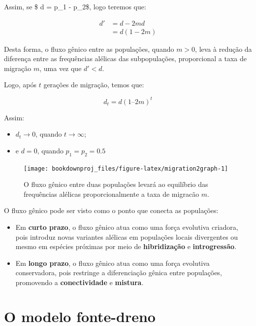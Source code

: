 \documentclass[
]{book}
\begin{document}
Assim, se \$ d = p\_1 - p\_2\$, logo teremos que:

\[
\begin{aligned}
d'
&= d - 2md \\
&= d(1-2m) 
\end{aligned}
\]

Desta forma, o fluxo gênico entre as populações, quando \(m>0\), leva à redução da diferença entre as frequências alélicas das subpopulações, proporcional a taxa de migração \(m\), uma vez que \(d'<d\).

Logo, após \(t\) gerações de migração, temos que:

\[d_t = d(1 – 2m)^t\]

Assim:

\begin{itemize}
\item
  \(d_t \to 0\), quando \(t \to \infty\);
\item
  e \(d = 0\), quando \(p_1 = p_2 = 0.5\)
\end{itemize}

\begin{figure}

{\centering \texttt{[image: bookdownproj\_files/figure-latex/migration2graph-1]} 

}

\caption{O fluxo gênico entre duas populações levará ao equilíbrio das frequências alélicas proporcionalmente a taxa de migracão $m$.}\label{fig:migration2graph}
\end{figure}

O fluxo gênico pode ser visto como o ponto que conecta as populações:

\begin{itemize}
\item
  Em \textbf{curto prazo}, o fluxo gênico atua como uma força evolutiva criadora, pois introduz novas variantes alélicas em populações locais divergentes ou mesmo em espécies próximas por meio de \textbf{hibridização} e \textbf{introgressão}.
\item
  Em \textbf{longo prazo}, o fluxo gênico atua como uma força evolutiva conservadora, pois restringe a diferenciação gênica entre populações, promovendo a \textbf{conectividade} e \textbf{mistura}.
\end{itemize}

\hypertarget{o-modelo-fonte-dreno}{%
\section{O modelo fonte-dreno}\label{o-modelo-fonte-dreno}}
\end{document}
